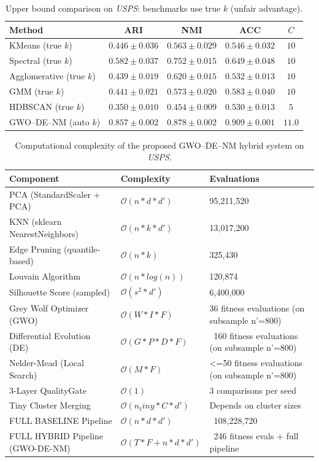 \begin{table}[htbp]
\centering\small
\caption{Upper bound comparison on \textit{USPS}: benchmarks use true $k$ (unfair advantage).}
\label{tab:upper_usps}
\begin{tabular}{lcccc}
\toprule
Method & ARI & NMI & ACC & $C$ \\
\midrule
KMeans (true $k$) & $0.446 \pm 0.036$ & $0.563 \pm 0.029$ & $0.546 \pm 0.032$ & $10$ \\
Spectral (true $k$) & $0.582 \pm 0.037$ & $0.752 \pm 0.015$ & $0.649 \pm 0.048$ & $10$ \\
Agglomerative (true $k$) & $0.439 \pm 0.019$ & $0.620 \pm 0.015$ & $0.532 \pm 0.013$ & $10$ \\
GMM (true $k$) & $0.441 \pm 0.021$ & $0.573 \pm 0.020$ & $0.583 \pm 0.040$ & $10$ \\
HDBSCAN (true $k$) & $0.350 \pm 0.010$ & $0.454 \pm 0.009$ & $0.530 \pm 0.013$ & $5$ \\
\midrule
GWO--DE--NM (auto $k$) & $\mathbf{0.857 \pm 0.002}$ & $\mathbf{0.878 \pm 0.002}$ & $\mathbf{0.909 \pm 0.001}$ & $11.0$ \\
\bottomrule
\end{tabular}
\end{table}

\begin{table}[htbp]
\centering
\small
\caption{Computational complexity of the proposed GWO--DE--NM hybrid system on \textit{USPS}.}
\label{tab:complexity_usps}
\begin{tabular}{lll}
\toprule
Component & Complexity & Evaluations \\
\midrule
PCA (StandardScaler + PCA) & $\mathcal{O}(n * d * d')$ & 95,211,520 \\
KNN (sklearn NearestNeighbors) & $\mathcal{O}(n * k * d')$ & 13,017,200 \\
Edge Pruning (quantile-based) & $\mathcal{O}(n * k)$ & 325,430 \\
Louvain Algorithm & $\mathcal{O}(n * log(n))$ & 120,874 \\
Silhouette Score (sampled) & $\mathcal{O}(s^2 * d')$ & 6,400,000 \\
Grey Wolf Optimizer (GWO) & $\mathcal{O}(W * I * F)$ & 36 fitness evaluations (on subsample n'=800) \\
Differential Evolution (DE) & $\mathcal{O}(G * P * D * F)$ & ~160 fitness evaluations (on subsample n'=800) \\
Nelder-Mead (Local Search) & $\mathcal{O}(M * F)$ & <=50 fitness evaluations (on subsample n'=800) \\
3-Layer QualityGate & $\mathcal{O}(1)$ & 3 comparisons per seed \\
Tiny Cluster Merging & $\mathcal{O}(n_tiny * C * d')$ & Depends on cluster sizes \\
\midrule
FULL BASELINE Pipeline & $\mathcal{O}(n * d * d')$ & ~108,228,720 \\
\midrule
FULL HYBRID Pipeline (GWO-DE-NM) & $\mathcal{O}(T * F + n * d * d')$ & ~246 fitness evals + full pipeline \\
\bottomrule
\end{tabular}
\end{table}